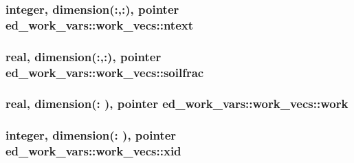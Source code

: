 \subsubsection[{\texorpdfstring{ntext}{ntext}}]{\setlength{\rightskip}{0pt plus 5cm}integer, dimension(\+:,\+:), pointer ed\+\_\+work\+\_\+vars\+::work\+\_\+vecs\+::ntext}\hypertarget{structed__work__vars_1_1work__vecs_a898272bb541b0bd262ff3efe1a0f919d}{}\label{structed__work__vars_1_1work__vecs_a898272bb541b0bd262ff3efe1a0f919d}
\subsubsection[{\texorpdfstring{soilfrac}{soilfrac}}]{\setlength{\rightskip}{0pt plus 5cm}real, dimension(\+:,\+:), pointer ed\+\_\+work\+\_\+vars\+::work\+\_\+vecs\+::soilfrac}\hypertarget{structed__work__vars_1_1work__vecs_aaf7951b3fc6d10862e1a9110027766ea}{}\label{structed__work__vars_1_1work__vecs_aaf7951b3fc6d10862e1a9110027766ea}
\subsubsection[{\texorpdfstring{work}{work}}]{\setlength{\rightskip}{0pt plus 5cm}real, dimension(\+:  ), pointer ed\+\_\+work\+\_\+vars\+::work\+\_\+vecs\+::work}\hypertarget{structed__work__vars_1_1work__vecs_aa5dbf6c86b514fd72da0b0121693fcb9}{}\label{structed__work__vars_1_1work__vecs_aa5dbf6c86b514fd72da0b0121693fcb9}
\subsubsection[{\texorpdfstring{xid}{xid}}]{\setlength{\rightskip}{0pt plus 5cm}integer, dimension(\+:  ), pointer ed\+\_\+work\+\_\+vars\+::work\+\_\+vecs\+::xid}\hypertarget{structed__work__vars_1_1work__vecs_afff01fc8dd99c5d3bbe9bbea9234381a}{}\label{structed__work__vars_1_1work__vecs_afff01fc8dd99c5d3bbe9bbea9234381a}
